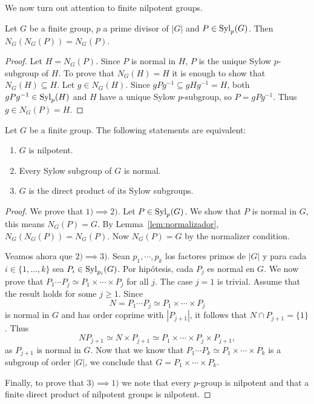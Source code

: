 We now turn out attention to finite nilpotent groups. 

\begin{lemma}
	\label{lem:normalizador}
	Let $G$ be a finite group, $p$ a prime divisor of $|G|$ and 
	$P\in\mathrm{Syl}_p(G)$. Then
	$N_G(N_G(P))=N_G(P)$. 
\end{lemma}

\begin{proof}
	Let $H=N_G(P)$. Since $P$ is normal in $H$, $P$ is the unique Sylow 
	$p$-subgroup of $H$. To prove that $N_G(H)=H$ it is enough to show that $N_G(H)\subseteq
	H$. Let $g\in N_G(H)$. Since  
	$gPg^{-1}\subseteq gHg^{-1}=H$, 
	both 
	$gPg^{-1}\in\mathrm{Syl}_p(H)$ and $H$ have a unique Sylow $p$-subgroup, so   
	$P=gPg^{-1}$. Thus $g\in N_G(P)=H$. 
\end{proof}

\begin{theorem}
	\label{thm:nilpotente:eq}
	Let $G$ be a finite group. The following statements are equivalent: 
	\begin{enumerate}
		\item $G$ is nilpotent.
		\item Every Sylow subgroup of $G$ is normal.
		\item $G$ is the direct product of its Sylow subgroups. 
	\end{enumerate}
\end{theorem}

\begin{proof}
	We prove that $1)\implies 2)$. Let $P\in\mathrm{Syl}_p(G)$. We show that $P$ is normal in $G$, this means 
	$N_G(P)=G$. By Lemma~\ref{lem:normalizador},  
	$N_G(N_G(P))=N_G(P)$. Now  $N_G(P)=G$ by the normalizer condition.

	Veamos ahora que $2)\implies 3)$. Sean $p_1,\cdots,p_k$ los factores
	primos de $|G|$ y para cada $i\in\{1,\dots,k\}$ sea $P_i\in\mathrm{Syl}_{p_i}(G)$.
	Por hipótesis, cada $P_j$ es normal en $G$.
	We now prove that $P_1\cdots P_j\simeq P_1\times\cdots\times P_j$ for all $j$.
	The case $j=1$ is trivial. Assume that the result holds for some 
	$j\geq 1$. Since  
	\[
	N=P_1\cdots P_j\simeq P_1\times\cdots\times P_j
	\]
	is normal in $G$ and has order coprime with $|P_{j+1}|$, it follows that $N\cap
	P_{j+1}=\{1\}$. Thus 
	\[
		NP_{j+1}\simeq N\times P_{j+1}\simeq P_1\times\cdots\times P_j\times P_{j+1}, 
	\]
	as $P_{j+1}$ is normal in $G$. 
	Now that we know that $P_1\cdots P_k\simeq P_1\times\cdots\times P_k$ is a subgroup of order 
	$|G|$, we conclude that $G=P_1\times\cdots\times P_k$.

	Finally, to prove that $3)\implies 1)$ we note that every 
	$p$-group is nilpotent and that a finite direct product of nilpotent groups is nilpotent. 
\end{proof}

